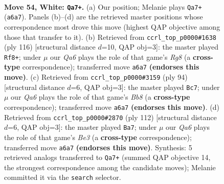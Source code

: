 \documentclass[11pt]{article}
\begin{document}
\clearpage

\begin{figure}[p]\centering
\begin{subfigure}{0.46\textwidth}\centering
\resizebox{\linewidth}{!}{%
\newchessgame
\chessboard[
  setfen={3r4/4k3/Q7/8/4P3/8/6PP/1K6 w - - 3 54},
  showmover=false,
  pgfstyle=straightmove, color=movearrow, markmove={a6-a7}
]}
\caption{}
\end{subfigure}\hfill
\begin{subfigure}{0.46\textwidth}\centering
\resizebox{\linewidth}{!}{%
\newchessgame
\chessboard[
  setfen={6R1/8/8/p2p3P/3P1k2/4r3/1K6/8 w - - 1 59},
  showmover=false,
  pgfstyle=straightmove, color=movearrow, markmove={g8-f8}
]}
\caption{}
\end{subfigure}
\\[4pt]
\begin{subfigure}{0.46\textwidth}\centering
\resizebox{\linewidth}{!}{%
\newchessgame
\chessboard[
  setfen={1B6/8/8/3P1k2/4r3/K7/2P5/8 w - - 12 48},
  showmover=false,
  pgfstyle=straightmove, color=movearrow, markmove={b8-c7}
]}
\caption{}
\end{subfigure}\hfill
\begin{subfigure}{0.46\textwidth}\centering
\resizebox{\linewidth}{!}{%
\newchessgame
\chessboard[
  setfen={5r2/6k1/8/P2p4/8/1P2B3/8/1K6 w - - 0 57},
  showmover=false,
  pgfstyle=straightmove, color=movearrow, markmove={e3-a7}
]}
\caption{}
\end{subfigure}
\caption{\textbf{Move 54, White: \texttt{Qa7+}.} (a) Our position; Melanie plays \texttt{Qa7+} (\texttt{a6a7}). Panels (b)--(d) are the retrieved master positions whose correspondence most drove this move (highest QAP objective among those that transfer to it). (b) Retrieved from \texttt{ccrl\_top\_p0000\#1638} (ply 116) [structural distance $d$=10, QAP obj=3]: the master played \texttt{Rf8+}; under $\mu$ our \emph{Qa6} plays the role of that game's \emph{Rg8} (a \textbf{cross-type} correspondence); transferred move \texttt{a6a7} \textbf{(endorses this move)}. (c) Retrieved from \texttt{ccrl\_top\_p0000\#3159} (ply 94) [structural distance $d$=6, QAP obj=3]: the master played \texttt{Bc7}; under $\mu$ our \emph{Qa6} plays the role of that game's \emph{Bb8} (a \textbf{cross-type} correspondence); transferred move \texttt{a6a7} \textbf{(endorses this move)}. (d) Retrieved from \texttt{ccrl\_top\_p0000\#2870} (ply 112) [structural distance $d$=6, QAP obj=3]: the master played \texttt{Ba7}; under $\mu$ our \emph{Qa6} plays the role of that game's \emph{Be3} (a \textbf{cross-type} correspondence); transferred move \texttt{a6a7} \textbf{(endorses this move)}. Synthesis: 5 retrieved analogs transferred to \texttt{Qa7+} (summed QAP objective 14, the strongest correspondence among the candidate moves); Melanie committed it via the \texttt{search} selector.}
\label{fig:thought-m106}
\end{figure}
\end{document}
